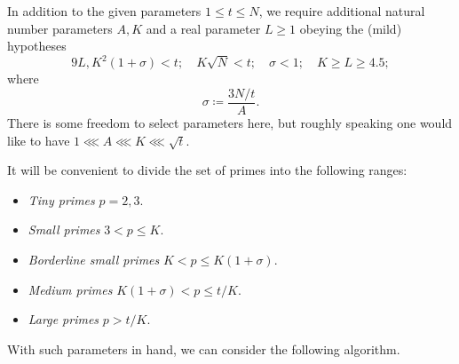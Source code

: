 \documentclass[12pt,a4paper,reqno]{amsart}
\numberwithin{equation}{section}
\theoremstyle{plain}
\theoremstyle{definition}
\begin{document}
In addition to the given parameters $1 \leq t \leq N$, we require additional natural number parameters $A,K$ and a real parameter $L \geq 1$ obeying the (mild) hypotheses
\begin{equation}\label{condition}
  9L, K^2 (1+\sigma) < t; \quad K\sqrt{N} < t; \quad \sigma < 1; \quad K \geq L \geq 4.5; 
\end{equation}
where
\begin{equation}\label{sigma-def}
  \sigma \coloneqq \frac{3N/t}{A}.
\end{equation}  
There is some freedom to select parameters here, but roughly speaking one would like to have $1 \lll A \lll K \lll \sqrt{t}$.

It will be convenient to divide the set of primes into the following ranges:
\begin{itemize}
\item \emph{Tiny primes} $p=2,3$.
\item \emph{Small primes} $3 < p \leq K$.
\item \emph{Borderline small primes} $K < p \leq K(1+\sigma)$.
\item \emph{Medium primes} $K(1+\sigma) < p \leq t/K$.
\item \emph{Large primes} $p > t/K$.
\end{itemize}

With such parameters in hand, we can consider the following algorithm.
\end{document}
